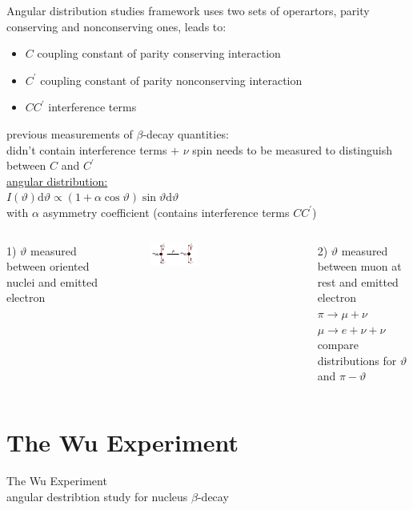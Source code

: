 \documentclass[aspectratio=1610, 10pt]{beamer}
\begin{document}
\begin{frame}{Angular distribution studies}
	framework uses two sets of operartors, parity conserving and nonconserving ones, leads to:
	\begin{itemize}
		\item $C$ coupling constant of parity conserving interaction
		\item $C^{'}$ coupling constant of parity nonconserving interaction
		\item $CC^{'}$ interference terms
	\end{itemize}
	previous measurements of $\beta$-decay quantities:\\
	\textrightarrow didn't contain interference terms $+$ $\nu$ spin needs to be measured to distinguish between $C$ and $C^{'}$\\
	\vspace{0.2cm}
	\underline{angular distribution:}\\
	$I(\vartheta) \text{d}\vartheta \propto (1 + \alpha \cos\vartheta)\sin\vartheta \text{d}\vartheta$\\
	with $\alpha$ asymmetry coefficient (contains interference terms $CC^{'}$)\\
	\vspace{0.2cm}
	\begin{columns}
		1) $\vartheta$ measured between oriented nuclei and emitted electron
		\begin{figure}
			\includegraphics[width=0.4\textwidth]{images/parity_solinoid.png}
		\end{figure}
		2) $\vartheta$ measured between muon at rest and emitted electron\\
		$	\pi \rightarrow \mu + \nu$\\
			$\mu \rightarrow e + \nu + \nu$\\
		compare distributions for $\vartheta$ and $\pi - \vartheta$
	\end{columns}
\end{frame}

\section{The Wu Experiment}
\begin{frame}
	\begin{center}
		\begin{Large}
			The Wu Experiment\\
			angular destribtion study for nucleus $\beta$-decay
		\end{Large}
	\end{center}
\end{frame}
\end{document}
